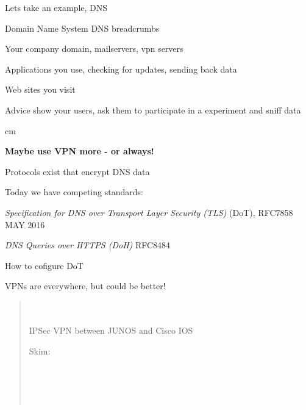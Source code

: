 \documentclass[Screen16to9,17pt]{foils}
\begin{document}

\begin{list1}
\item Lets take an example, DNS
\item Domain Name System DNS breadcrumbs
\begin{list2}
\item Your company domain, mailservers, vpn servers
\item Applications you use, checking for updates, sending back data
\item Web sites you visit
\end{list2}
\vskip 1cm
\item Advice show your users, ask them to participate in a experiment and sniff data
\end{list1}


 cm
\centerline{\bf\Large Maybe use VPN more - or always!}


\begin{list2}
\item Protocols exist that encrypt DNS data
\item Today we have competing standards:
\item
\emph{Specification for DNS over Transport Layer Security (TLS)} (DoT), RFC7858 MAY 2016\\

\item \emph{DNS Queries over HTTPS (DoH)} RFC8484

\item How to cofigure DoT\\ 
\end{list2}




VPNs are everywhere, but could be better!

\begin{quote}
\\
\\
IPSec VPN between JUNOS and Cisco IOS

Skim:\\
\\
\\
\\
\\
\end{quote}
\end{document}
